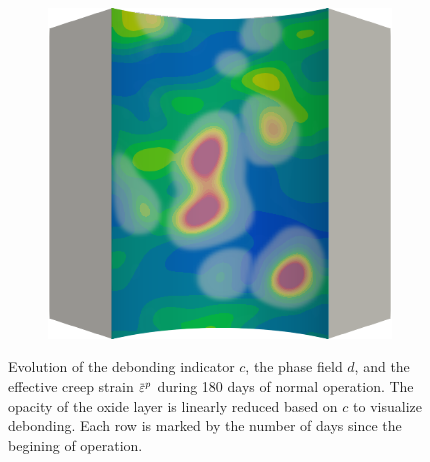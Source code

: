 \begin{figure}[!htbp]
\begin{subfigure}{0.19\textwidth}
  \end{subfigure}
  \hspace{0.06\textwidth}
  \begin{subfigure}{0.19\textwidth}
    \centering
    \includegraphics[width=\textwidth]{Chapter5/figures/spallation/ep.0018}
  \end{subfigure}
  \caption[Animations of variables during normal operation.]{Evolution of the debonding indicator $c$, the phase field $d$, and the effective creep strain $\ep$ during 180 days of normal operation. The opacity of the oxide layer is linearly reduced based on $c$ to visualize debonding. Each row is marked by the number of days since the begining of operation.}
  \label{fig: Chapter5/spallation/animation_normal}
\end{figure}
